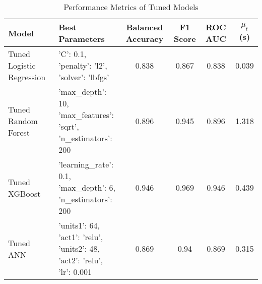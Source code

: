 \begin{table}[h!]
\centering
\caption{Performance Metrics of Tuned Models}
\label{tab:model_performance}
\begin{tabular}{llcccc}
\toprule
\textbf{Model} & \textbf{Best Parameters} & \textbf{Balanced Accuracy} & \textbf{F1 Score} & \textbf{ROC AUC} & $\mu_t$ (s) \\
\midrule
Tuned Logistic Regression & {'C': 0.1,\\ 'penalty': 'l2',\\ 'solver': 'lbfgs'} & 0.838 & 0.867 & 0.838 & 0.039 \\
Tuned Random Forest & {'max\_depth': 10,\\ 'max\_features': 'sqrt',\\ 'n\_estimators': 200} & 0.896 & 0.945 & 0.896 & 1.318 \\
Tuned XGBoost & {'learning\_rate': 0.1,\\ 'max\_depth': 6,\\ 'n\_estimators': 200} & 0.946 & 0.969 & 0.946 & 0.439 \\
Tuned ANN & {'units1': 64,\\ 'act1': 'relu',\\ 'units2': 48,\\ 'act2': 'relu',\\ 'lr': 0.001} & 0.869 & 0.94 & 0.869 & 0.315 \\
\bottomrule
\end{tabular}
\end{table}
